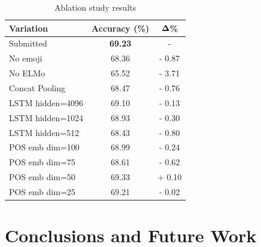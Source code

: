 \documentclass[11pt,a4paper]{article}
\begin{document}
\begin{table}[!h]
    \centering
    \footnotesize

    \begin{tabular}{lcc}

        \textbf{Variation} & \textbf{Accuracy (\%)} & $\bf{\Delta}$\textbf{\%} \\
        \hline
        \hline
        Submitted          & \textbf{69.23}         & -               \\
        \hline
        No emoji           & 68.36                  & - 0.87          \\
        \hline
        No ELMo            & 65.52                  & - 3.71          \\
        \hline
        Concat Pooling     & 68.47                  & - 0.76          \\
        \hline
        LSTM hidden=4096   & 69.10                  & - 0.13          \\
        LSTM hidden=1024   & 68.93                  & - 0.30          \\
        LSTM hidden=512    & 68.43                  & - 0.80          \\
        \hline
        POS emb dim=100    & 68.99                  & - 0.24          \\
        POS emb dim=75     & 68.61                  & - 0.62          \\
        POS emb dim=50     & 69.33                  & + 0.10          \\
        POS emb dim=25     & 69.21                  & - 0.02          \\

    \end{tabular}
    \caption{Ablation study results}

\end{table}

\section{Conclusions and Future Work}




\end{document}
